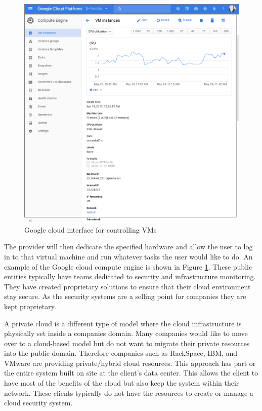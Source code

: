 \documentclass[12pt]{article}
\begin{document}
\begin{figure}[ht]
    \centering
    \includegraphics[scale=.4]{./pic/2017-05-24-114324_946x962_scrot.png}
    \caption{Google cloud interface for controlling VMs}
    \label{fig:GoogleInterface}
\end{figure}

The provider will then dedicate the specified hardware and allow the user to log in to that virtual machine and run whatever tasks the user would like to do. An example of the Google cloud compute engine is shown in Figure \ref{fig:GoogleInterface}.  These public entities typically have teams dedicated to security and infrastructure monitoring. They have created proprietary solutions to ensure that their cloud environment \cite{SecAmazon} stay secure. As the security systems are a selling point for companies they are kept proprietary.

A private cloud is a different type of model where the cloud infrastructure is physically set inside a companies domain. Many companies would like to move over to a cloud-based model but do not want to migrate their private resources into the public domain. Therefore companies such as RackSpace, IBM, and VMware are providing private/hybrid cloud resources. This approach has part or the entire system built on site at the client's data center. This allows the client to have most of the benefits of the cloud but also keep the system within their network. These clients typically do not have the resources to create or manage a cloud security system.
\end{document}
